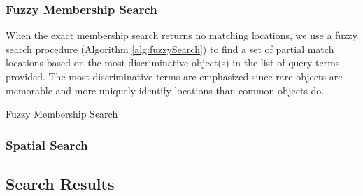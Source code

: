 \subsubsection{\textbf{Fuzzy Membership Search}}
When the exact membership search returns no matching locations, we use a fuzzy search procedure (Algorithm \ref{alg:fuzzySearch}) to find a set of partial match locations based on the most discriminative object(s) in the list of query terms provided. 
The most discriminative terms are emphasized since rare objects are memorable and more uniquely identify locations than common objects do.

\begin{algorithm}
    \caption{Fuzzy Membership Search}\label{alg:fuzzySearch}
    \begin{algorithmic}[2]
        \State{- - - - -}
                \Else
                \EndIf
            \EndIf
            \EndIf
        \EndProcedure
    \end{algorithmic}
\end{algorithm}

\subsubsection{\textbf{Spatial Search}}





\subsection{Search Results}

